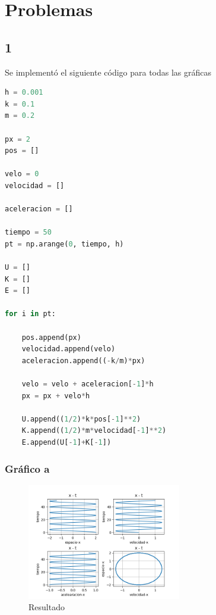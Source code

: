 \documentclass{article}
\begin{document}
\section{Problemas}
\subsection{1}
Se implementó el siguiente código para todas las gráficas
\begin{lstlisting}[language=Python,caption=Desafío 1.1]
h = 0.001
k = 0.1
m = 0.2

px = 2
pos = []

velo = 0
velocidad = []

aceleracion = []

tiempo = 50
pt = np.arange(0, tiempo, h)

U = []
K = []
E = []

for i in pt:

    pos.append(px)
    velocidad.append(velo)
    aceleracion.append((-k/m)*px)

    velo = velo + aceleracion[-1]*h
    px = px + velo*h
    
    U.append((1/2)*k*pos[-1]**2)
    K.append((1/2)*m*velocidad[-1]**2)
    E.append(U[-1]+K[-1])
\end{lstlisting}

\subsubsection{Gráfico a}
\begin{figure}[H]
    \centering
    \includegraphics[width=0.6\textwidth]{Figure_1.png}
    \caption{Resultado}
\end{figure}
\end{document}
